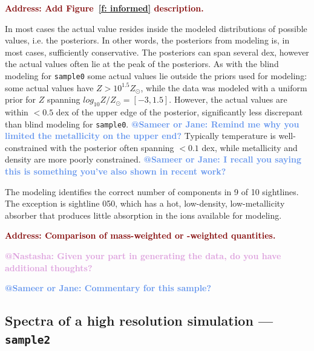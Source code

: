 \documentclass[fleqn,usenatbib]{mnras}
\makeatletter
\newcommand{\todo}[1]{\textcolor{Maroon}{\textbf{Address: #1}}}
\newcommand{\atsameer}[1]{\textcolor{CornflowerBlue}{\textbf{@Sameer or Jane: #1}}}
\newcommand{\atnastasha}[1]{\textcolor{Plum}{\textbf{@Nastasha: #1}}}
\makeatother
\begin{document}
\todo{Add Figure~\ref{f: informed} description.}

In most cases the actual value resides inside the modeled distributions of possible values, i.e. the posteriors.
In other words, the posteriors from modeling is, in most cases, sufficiently conservative.
The posteriors can span several dex, however the actual values often lie at the peak of the posteriors.
As with the blind modeling for \texttt{sample0} some actual values lie outside the priors used for modeling: some actual values have $Z > 10^{1.5} Z_\odot$, while the data was modeled with a uniform prior for $Z$ spanning $log_{10} Z/Z_\odot = [-3, 1.5]$.
However, the actual values are within $< 0.5$ dex of the upper edge of the posterior, significantly less discrepant than blind modeling for \texttt{sample0}.
\atsameer{Remind me why you limited the metallicity on the upper end?}
Typically temperature is well-constrained with the posterior often spanning $<0.1$ dex, while metallicity and density are more poorly constrained.
\atsameer{I recall you saying this is something you've also shown in recent work?}

The modeling identifies the correct number of components in 9 of 10 sightlines.
The exception is sightline 050, which has a hot, low-density, low-metallicity absorber that produces little absorption in the ions available for modeling.

\todo{Comparison of mass-weighted or -weighted quantities.}

\atnastasha{Given your part in generating the data, do you have additional thoughts?}

\atsameer{Commentary for this sample?}

\subsection{Spectra of a high resolution simulation --- \texttt{sample2}}
\label{s: results -- sample2}
\end{document}
